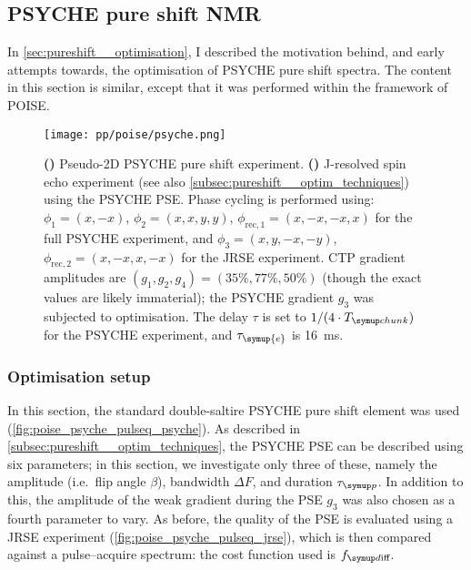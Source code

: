 \subsection{PSYCHE pure shift NMR}
\label{subsec:poise__psyche}

In \cref{sec:pureshift__optimisation}, I described the motivation behind, and early attempts towards, the optimisation of PSYCHE pure shift spectra.
The content in this section is similar, except that it was performed within the framework of POISE.

\begin{figure}[htb]
    \centering
    \texttt{[image: pp/poise/psyche.png]}%
    {\label{fig:poise_psyche_pulseq_psyche}}%
    {\label{fig:poise_psyche_pulseq_jrse}}%
    \caption[Pulse sequences used for PSYCHE optimisations]{
        \textbf{()} Pseudo-2D PSYCHE pure shift experiment.
        \textbf{()} J-resolved spin echo experiment (see also \cref{subsec:pureshift__optim_techniques}) using the PSYCHE PSE.
        Phase cycling is performed using: $\phi_1 = (x, -x)$, $\phi_2 = (x, x, y, y)$, $\phi_{\text{rec},1} = (x, -x, -x, x)$ for the full PSYCHE experiment, and $\phi_3 = (x, y, -x, -y)$, $\phi_{\text{rec},2} = (x, -x, x, -x)$ for the JRSE experiment.
        CTP gradient amplitudes are $(g_1, g_2, g_4) = (35\%, 77\%, 50\%)$ (though the exact values are likely immaterial); the PSYCHE gradient $g_3$ was subjected to optimisation.
        The delay $\tau$ is set to $1/(4 \cdot \Tchunk)$ for the PSYCHE experiment, and $\tau_{\symup{e}}$ is \qty{16}{\ms}.
    }
    \label{fig:poise_psyche_pulseq}
\end{figure}



\subsubsection{Optimisation setup}

In this section, the standard double-saltire PSYCHE pure shift element was used (\cref{fig:poise_psyche_pulseq_psyche}).\autocite{Foroozandeh2014ACIE,Foroozandeh2018CEJ}
As described in \cref{subsec:pureshift__optim_techniques}, the PSYCHE PSE can be described using six parameters; in this section, we investigate only three of these, namely the amplitude (i.e.\ flip angle $\beta$), bandwidth $\Delta F$, and duration $\taup$.
In addition to this, the amplitude of the weak gradient during the PSE $g_3$ was also chosen as a fourth parameter to vary.
As before, the quality of the PSE is evaluated using a JRSE experiment (\cref{fig:poise_psyche_pulseq_jrse}), which is then compared against a pulse--acquire spectrum: the cost function used is $\fdiff$.


